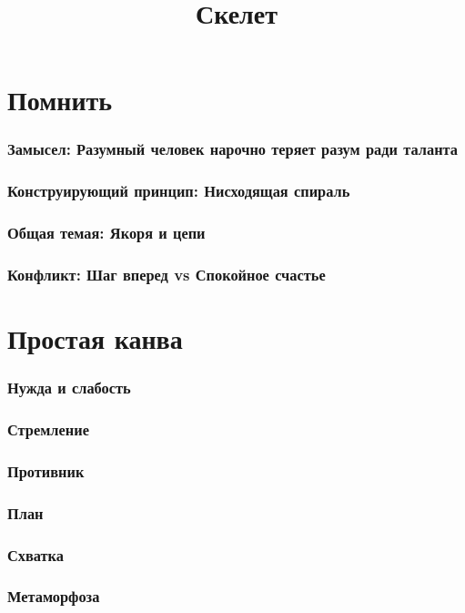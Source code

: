 
\title{Скелет}
\maketitle
\tableofcontents

\clearpage
\part{Помнить}
\section{Замысел: Разумный человек нарочно теряет разум ради таланта}
\section{Конструирующий принцип: Нисходящая спираль}
\section{Общая темая: Якоря и цепи}
\section{Конфликт: Шаг вперед vs Спокойное счастье}





\clearpage
\part{Простая канва}
\section{Нужда и слабость}
\section{Стремление}
\section{Противник}
\section{План}
\section{Схватка}
\section{Метаморфоза}
